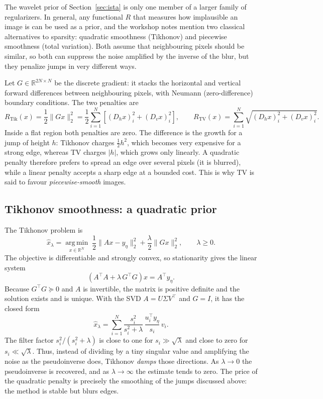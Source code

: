 \documentclass[11pt,a4paper]{article}
\newcommand{\R}{\mathbb{R}}
\newcommand{\argmin}{\operatorname*{arg\,min}}
\newcommand{\T}{\top}
\begin{document}
The wavelet prior of Section~\ref{sec:ista} is only one member of a larger family of
regularizers. In general, any functional $R$ that measures how implausible an image is can be
used as a prior, and the workshop notes mention two classical alternatives to sparsity:
quadratic smoothness (Tikhonov) and piecewise smoothness (total variation). Both assume that
neighbouring pixels should be similar, so both can suppress the noise amplified by the inverse
of the blur, but they penalize jumps in very different ways.

Let $G\in\R^{2N\times N}$ be the discrete gradient: it stacks the horizontal and vertical
forward differences between neighbouring pixels, with Neumann (zero-difference) boundary
conditions. The two penalties are
\begin{equation}
R_{\text{Tik}}(x)=\frac12\|Gx\|_2^2
=\frac12\sum_{i=1}^{N}\left[(D_hx)_i^2+(D_vx)_i^2\right],
\qquad
R_{\text{TV}}(x)=\sum_{i=1}^{N}\sqrt{(D_hx)_i^2+(D_vx)_i^2}.
\label{eq:priors}
\end{equation}
Inside a flat region both penalties are zero. The difference is the growth for a jump of height
$h$: Tikhonov charges $\tfrac12 h^2$, which becomes very expensive for a strong edge, whereas TV
charges $|h|$, which grows only linearly. A quadratic penalty therefore prefers to spread an edge
over several pixels (it is blurred), while a linear penalty accepts a sharp edge at a bounded
cost. This is why TV is said to favour \emph{piecewise-smooth} images.

\subsection{Tikhonov smoothness: a quadratic prior}

The Tikhonov problem is
\begin{equation}
\hat{x}_\lambda=\argmin_{x\in\R^N}\;
\frac12\|Ax-y_\eta\|_2^2+\frac{\lambda}{2}\|Gx\|_2^2,
\qquad \lambda\ge0 .
\label{eq:tikobj}
\end{equation}
The objective is differentiable and strongly convex, so stationarity gives the linear system
\begin{equation}
\left(A^\T A+\lambda\,G^\T G\right)x=A^\T y_\eta .
\label{eq:tiknormal}
\end{equation}
Because $G^\T G\succeq0$ and $A$ is invertible, the matrix is positive definite and the solution
exists and is unique. With the SVD $A=U\Sigma V^\T$ and $G=I$, it has the closed form
\begin{equation}
\hat{x}_\lambda=\sum_{i=1}^{N}\frac{s_i^2}{s_i^2+\lambda}\,
\frac{u_i^\T y_\eta}{s_i}\,v_i .
\label{eq:tikfilter}
\end{equation}
The filter factor $s_i^2/(s_i^2+\lambda)$ is close to one for $s_i\gg\sqrt{\lambda}$ and close to
zero for $s_i\ll\sqrt{\lambda}$. Thus, instead of dividing by a tiny singular value and
amplifying the noise as the pseudoinverse does, Tikhonov \emph{damps} those directions. As
$\lambda\to0$ the pseudoinverse is recovered, and as $\lambda\to\infty$ the estimate tends to
zero. The price of the quadratic penalty is precisely the smoothing of the jumps discussed
above: the method is stable but blurs edges.
\end{document}
